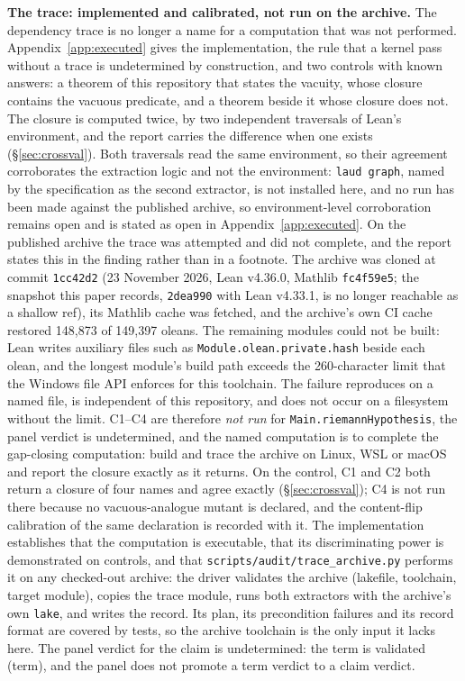 \documentclass[11pt,a4paper]{article}
\newcommand{\verdict}[1]{\textsf{#1}}
\begin{document}
\textbf{The trace: implemented and calibrated, not run on the archive.} The dependency
trace is no longer a name for a computation that was not performed.
Appendix~\ref{app:executed} gives the implementation, the rule that a kernel pass without a trace is
\verdict{undetermined} by construction, and two controls with known answers: a theorem of this
repository that states the vacuity, whose closure contains the vacuous predicate, and a theorem beside
it whose closure does not. The closure is computed twice, by two independent traversals of Lean's environment, and the
report carries the difference when one exists (\S\ref{sec:crossval}). Both traversals read the
same environment, so their agreement corroborates the extraction logic and not the environment:
\texttt{laud graph}, named by the specification as the second extractor, is not installed here,
and no run has been made against the published archive, so environment-level corroboration
remains open and is stated as open in Appendix~\ref{app:executed}. On the published archive the
trace was attempted and did not complete, and the report states this in the finding rather than in
a footnote. The archive was cloned at commit \texttt{1cc42d2} (23 November 2026, Lean v4.36.0,
Mathlib \texttt{fc4f59e5}; the snapshot this paper records, \texttt{2dea990} with Lean v4.33.1, is
no longer reachable as a shallow ref), its Mathlib cache was fetched, and the archive's own CI
cache restored 148{,}873 of 149{,}397 oleans. The remaining modules could not be built: Lean writes
auxiliary files such as \texttt{Module.olean.private.hash} beside each olean, and the longest
module's build path exceeds the 260-character limit that the Windows file API enforces for this
toolchain. The failure reproduces on a named file, is independent of this repository, and does not
occur on a filesystem without the limit. C1--C4 are therefore \emph{not run} for
\texttt{Main.riemannHypothesis}, the panel verdict is \verdict{undetermined}, and the named
computation is to complete the gap-closing computation: build and trace the archive on Linux, WSL
or macOS and report the closure exactly as it returns. On the control, C1 and C2 both return a
closure of four names and agree exactly (\S\ref{sec:crossval}); C4 is not run there because no
vacuous-analogue mutant is declared, and the content-flip calibration of the same declaration is
recorded with it. The implementation establishes
that the computation is executable, that its discriminating power is demonstrated on controls, and
that \texttt{scripts/audit/trace\_archive.py} performs it on any checked-out archive: the driver
validates the archive (lakefile, toolchain, target module), copies the trace module, runs both
extractors with the archive's own \texttt{lake}, and writes the record. Its plan, its precondition
failures and its record format are covered by tests, so the archive toolchain is the only input it
lacks here. The panel verdict for the
claim is \verdict{undetermined}: the term is \verdict{validated (term)}, and the panel does not
promote a term verdict to a claim verdict.
\end{document}
